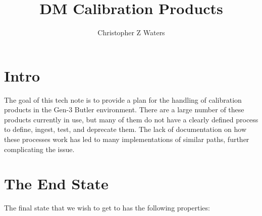 \documentclass[DM,authoryear,toc]{lsstdoc}
\title{DM Calibration Products}
\author{%
Christopher Z Waters
}
\date{\vcsDate}
\begin{document}
\maketitle


\section{Intro}

The goal of this tech note is to provide a plan for the handling of
calibration products in the Gen-3 Butler environment.  There are a
large number of these products currently in use, but many of them do
not have a clearly defined process to define, ingest, test, and
deprecate them.  The lack of documentation on how these processes work
has led to many implementations of similar paths, further complicating
the issue.


\section{The End State}

The final state that we wish to get to has the following properties:
\end{document}
